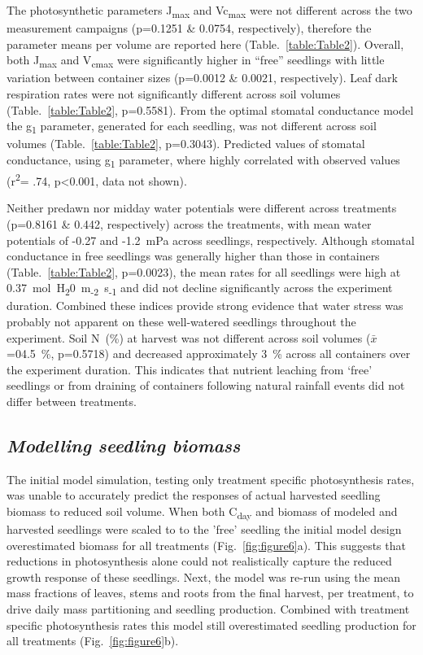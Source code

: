 \documentclass[a4paper]{article}\usepackage[]{graphicx}\usepackage[]{color}
\begin{document}
The photosynthetic parameters J\textsubscript{max} and Vc\textsubscript{max} were not different across the two measurement campaigns (p=0.1251 \& 0.0754, respectively), therefore the parameter means per volume are reported here (Table.~\ref{table:Table2}).  Overall, both J\textsubscript{max} and V\textsubscript{cmax} were significantly higher in “free” seedlings with little variation between container sizes (p=0.0012 \& 0.0021, respectively). Leaf dark respiration rates were not significantly different across soil volumes (Table.~\ref{table:Table2}, p=0.5581). From the \citet{medlyn2012reconciling} optimal stomatal conductance model the g\textsubscript{1} parameter, generated for each seedling, was not different across soil volumes (Table.~\ref{table:Table2}, p=0.3043). Predicted values of stomatal conductance, using g\textsubscript{1} parameter, where highly correlated with observed values (r\textsuperscript{2}= .74, p\textless0.001, data not shown).

Neither predawn nor midday water potentials were different across treatments (p=0.8161 \& 0.442, respectively) across the treatments, with mean water potentials of -0.27 and -1.2~mPa across seedlings, respectively. Although stomatal conductance in free seedlings was generally higher than those in containers (Table.~\ref{table:Table2}, p=0.0023), the mean rates for all seedlings were high at 0.37~mol~H\textsubscript{2}0~m\textsubscript{-2}~s\textsubscript{-1} and did not decline significantly across the experiment duration. Combined these indices provide strong evidence that water stress was probably not apparent on these well-watered seedlings throughout the experiment. Soil N~(\%) at harvest was not different across soil volumes ($\bar{x}$=04.5~\%, p=0.5718) and decreased approximately 3~\% across all containers over the experiment duration. This indicates that nutrient leaching from ‘free’ seedlings or from draining of containers following natural rainfall events did not differ between treatments. 

\subsection*{\textit{Modelling seedling biomass}}
The initial model simulation, testing only treatment specific photosynthesis rates, was unable to accurately predict the responses of actual harvested seedling biomass to reduced soil volume.  When both C\textsubscript{day} and biomass of modeled and harvested seedlings were scaled to to the 'free' seedling the initial model design overestimated biomass for all treatments (Fig.~\ref{fig:figure6}a).  This suggests that reductions in photosynthesis alone could not realistically capture the reduced growth response of these seedlings.  Next, the model was re-run using the mean mass fractions of leaves, stems and roots from the final harvest, per treatment, to drive daily mass partitioning and seedling production.  Combined with treatment specific photosynthesis rates this model still overestimated seedling production for all treatments (Fig.~\ref{fig:figure6}b).  
\end{document}
